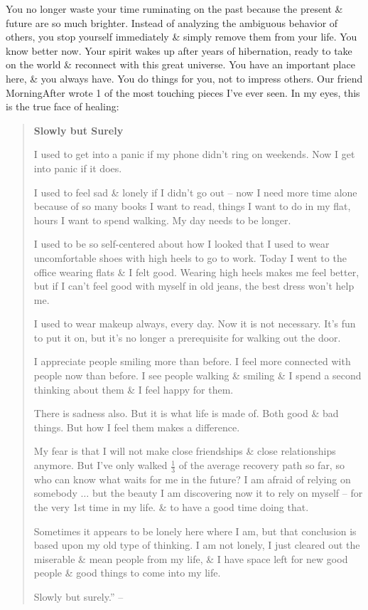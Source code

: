 \documentclass{article}
\numberwithin{equation}{section}
\begin{document}
You no longer waste your time ruminating on the past because the present \& future are so much brighter. Instead of analyzing the ambiguous behavior of others, you stop yourself immediately \& simply remove them from your life. You know better now. Your spirit wakes up after years of hibernation, ready to take on the world \& reconnect with this great universe. You have an important place here, \& you always have. You do things for you, not to impress others. Our friend MorningAfter wrote 1 of the most touching pieces I've ever seen. In my eyes, this is the true face of healing:

\begin{quotation}\it
	\begin{center}
		\textbf{Slowly but Surely}
	\end{center}
	I used to get into a panic if my phone didn't ring on weekends. Now I get into panic if it does.
	
	I used to feel sad \& lonely if I didn't go out -- now I need more time alone because of so many books I want to read, things I want to do in my flat, hours I want to spend walking. My day needs to be longer.
	
	I used to be so self-centered about how I looked that I used to wear uncomfortable shoes with high heels to go to work. Today I went to the office wearing flats \& I felt good. Wearing high heels makes me feel better, but if I can't feel good with myself in old jeans, the best dress won't help me.
	
	I used to wear makeup always, every day. Now it is not necessary. It's fun to put it on, but it's no longer a prerequisite for walking out the door.

	I appreciate people smiling more than before. I feel more connected with people now than before. I see people walking \& smiling \& I spend a second thinking about them \& I feel happy for them.
	
	There is sadness also. But it is what life is made of. Both good \& bad things. But how I feel them makes a difference.
	
	My fear is that I will not make close friendships \& close relationships anymore. But I've only walked $\frac{1}{3}$ of the average recovery path so far, so who can know what waits for me in the future? I am afraid of relying on somebody $\ldots$ but the beauty I am discovering now it to rely on myself -- for the very 1st time in my life. \& to have a good time doing that.
	
	Sometimes it appears to be lonely here where I am, but that conclusion is based upon my old type of thinking. I am not lonely, I just cleared out the miserable \& mean people from my life, \& I have space left for new good people \& good things to come into my life.
	
	Slowly but surely.'' -- {\rm\cite[pp. 176--178]{MacKenzie2015}}
\end{quotation}
\end{document}

